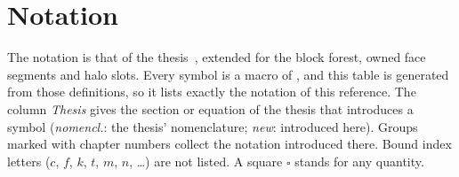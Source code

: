 \chapter{Notation}\label{app:notation}
The notation is that of the thesis~\cite{remmerswaal2023}, extended for the
block forest, owned face segments and halo slots. Every symbol is a macro of
, and this table is generated from those
definitions, so it lists exactly the notation of this reference. The column
\emph{Thesis} gives the section or equation of the thesis that introduces a
symbol (\emph{nomencl.}: the thesis' nomenclature; \emph{new}: introduced
here). Groups marked with chapter numbers collect the notation introduced
there. Bound index
letters ($c$, $f$, $k$, $t$, $m$, $n$, \dots) are not listed. A square
$\square$ stands for any quantity.

\PrintNotationTable
